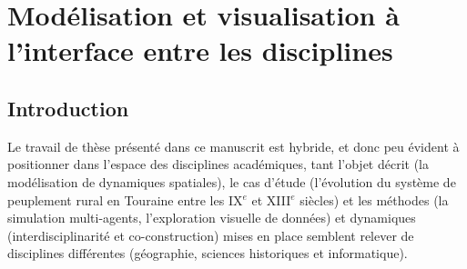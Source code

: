 \setcounter{chapter}{0}
\graphicspath{{chap1/}}


\chapter{Modélisation et visualisation à l'interface entre les disciplines}
\label{chap:chap1}
\setcounter{minitocdepth}{2}
\vfill
{}
\minitoc
{}
\clearpage
{}

\section*{Introduction}

Le travail de thèse présenté dans ce manuscrit est hybride, et donc peu évident à positionner dans l'espace des disciplines académiques, tant l'objet décrit (la modélisation de dynamiques spatiales), le cas d'étude (l'évolution du système de peuplement rural en Touraine entre les IX$^e$ et XIII$^e$ siècles) et les méthodes (la simulation multi-agents, l'exploration visuelle de données) et dynamiques (interdisciplinarité et co-construction) mises en place  semblent relever de disciplines différentes (géographie, sciences historiques et informatique).

